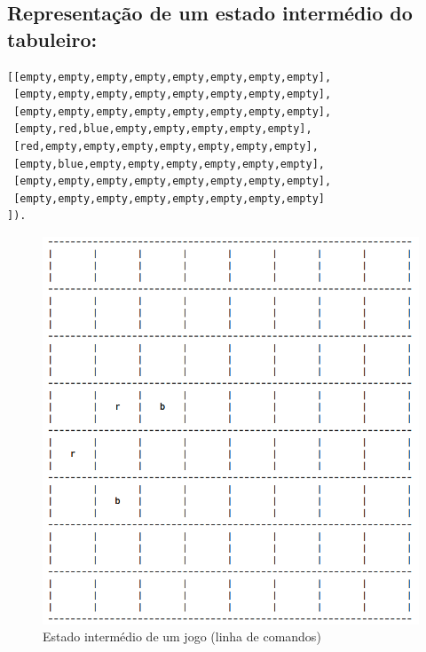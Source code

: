 \documentclass[a4paper,11pt,titlepage]{article}
\begin{document}
\subsection{Representação de um estado intermédio do tabuleiro:}
\begin{verbatim}
[[empty,empty,empty,empty,empty,empty,empty,empty],
 [empty,empty,empty,empty,empty,empty,empty,empty],
 [empty,empty,empty,empty,empty,empty,empty,empty],
 [empty,red,blue,empty,empty,empty,empty,empty],
 [red,empty,empty,empty,empty,empty,empty,empty],
 [empty,blue,empty,empty,empty,empty,empty,empty],
 [empty,empty,empty,empty,empty,empty,empty,empty],
 [empty,empty,empty,empty,empty,empty,empty,empty]
]).
\end{verbatim}

\begin{figure}[H]
    \center
    \includegraphics[scale=0.35]{res/intermediate-state-cli.png}
    \caption{Estado intermédio de um jogo (linha de comandos)}
    \label{fig:intermediate-state-cli.png}
\end{figure}
\end{document}
